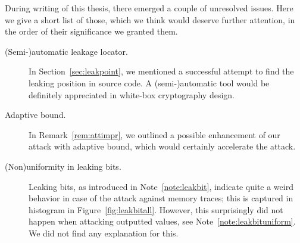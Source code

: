 During writing of this thesis, there emerged a couple of unresolved issues. Here we give a short list of those, which we think would deserve further attention, in the order of their significance we granted them.

\begin{description}
	\item[(Semi-)automatic leakage locator.] In Section~\ref{sec:leakpoint}, we mentioned a successful attempt to find the leaking position in source code. A (semi-)automatic tool would be definitely appreciated in white-box cryptography design.
	\item[Adaptive bound.] In Remark~\ref{rem:attimpr}, we outlined a possible enhancement of our attack with adaptive bound, which would certainly accelerate the attack.
	\item[(Non)uniformity in leaking bits.] Leaking bits, as introduced in Note~\ref{note:leakbit}, indicate quite a weird behavior in case of the attack against memory traces; this is captured in histogram in Figure~\ref{fig:leakbitall}. However, this surprisingly did not happen when attacking outputted values, see Note~\ref{note:leakbituniform}. We did not find any explanation for this.
\end{description}
